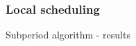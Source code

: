 \documentclass[]{prezentare}
\begin{document}

\begin{frame}
	\frametitle{Local scheduling}
	\begin{block}{Subperiod algorithm - results}
	
	\end{block}
\end{frame}

\end{document}
